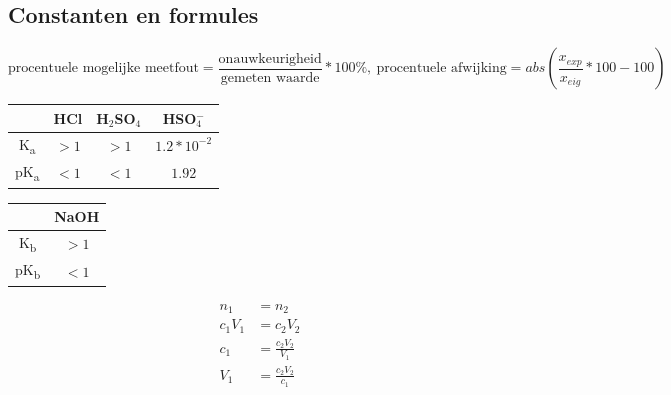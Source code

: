 \documentclass[11pt]{report}
\begin{document}
\subsection{Constanten en formules}
\begin{equation*}
        \text{procentuele mogelijke meetfout} = \frac{\text{onauwkeurigheid}}{\text{gemeten waarde}}*100\%,\ \text{procentuele afwijking} = abs(\frac{x_{exp}}{x_{eig}}*100-100)
\end{equation*}
\begin{tabular}{|c|c|c|c|}
    \hline
                        & HCl & H$_2$SO$_4$ & HSO$_4^-$ \\\hline
    K\textsubscript{a}  & $>1$ & $>1$ & $1.2*10^{-2}$ \\\hline
    pK\textsubscript{a} & $<1$ & $<1$ & $1.92$ \\\hline
\end{tabular}
\quad
\begin{tabular}{|c|c|}
    \hline
        & NaOH \\\hline
    K\textsubscript{b} & $>1$ \\\hline
    pK\textsubscript{b} & $<1$ \\\hline
\end{tabular}

\begin{equation*}
    \begin{split}
        n_1 &= n_2\\
        c_1V_1 &= c_2V_2\\
        c_1 &= \frac{c_2V_2}{V_1}\\
        V_1 &= \frac{c_2V_2}{c_1}\\
    \end{split}
\end{equation*}
\end{document}

